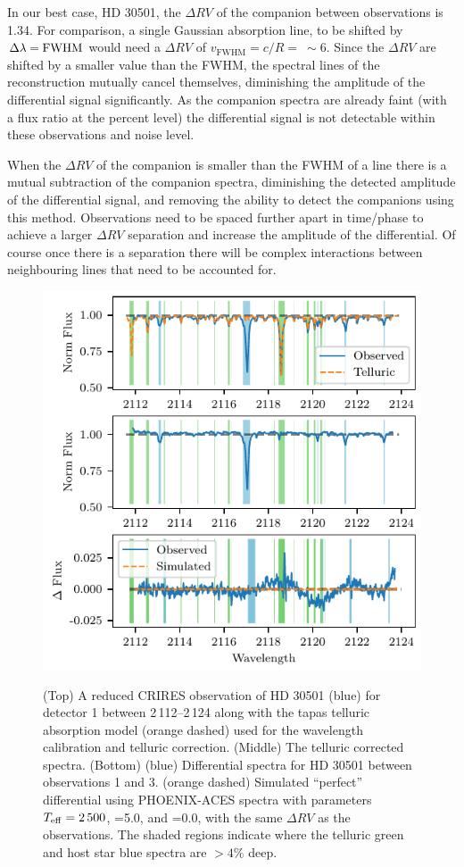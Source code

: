 In our best case, {HD 30501}, the \(\Delta {RV}\) of the companion between observations is 1.34\kmps{}. For comparison, a single Gaussian absorption line, to be shifted by \(\Delta\lambda = \rm {FWHM}\) would need a \(\Delta {RV}\) of \(v_{\textrm{FWHM}} = c/R =~\sim6\)\kmps{}. Since the \(\Delta {RV}\) are shifted by a smaller value than the {FWHM}, the spectral lines of the reconstruction mutually cancel themselves, diminishing the amplitude of the differential signal significantly. As the companion spectra are already faint (with a flux ratio at the percent level) the differential signal is not detectable within these observations and noise level.

When the \(\Delta {RV}\) of the companion is smaller than the {FWHM} of a line there is a mutual subtraction of the companion spectra, diminishing the detected amplitude of the differential signal, and removing the ability to detect the companions using this method. Observations need to be spaced further apart in time/phase to achieve a larger \(\Delta {RV}\) separation and increase the amplitude of the differential. Of course once there is a separation there will be complex interactions between neighbouring lines that need to be accounted for.


\begin{figure}
    \centering
    \includegraphics[width=0.8\hsize]{figures/direct-recovery/differential.pdf}\\
    \caption{(Top) A reduced {CRIRES} observation of {HD 30501} (blue) for detector 1 between 2\,112--2\,124\nm{} along with the tapas telluric absorption model ({orange} dashed) used for the wavelength calibration and telluric correction. (Middle) The telluric corrected spectra. (Bottom) ({blue}) Differential spectra for {HD 30501} between observations 1 and 3. ({orange} dashed) Simulated ``perfect'' differential using {PHOENIX-ACES} spectra with parameters \(T_{\mathrm{eff}}{}=2\,500\)\K{}, \logg{}=5.0, and \feh{}=0.0, with the same \(\Delta {RV}\) as the observations. The shaded regions indicate where the telluric {green} and host star {blue} spectra are \(> 4\%\) deep.}
    \label{fig:spectral_example}
\end{figure}


